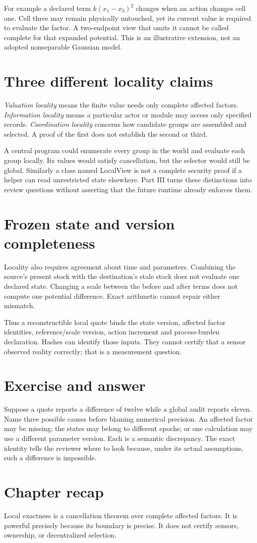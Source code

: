 For example a declared term $k(x_1-x_3)^2$ changes when an action changes
cell one. Cell three may remain physically untouched, yet its current
value is required to evaluate the factor. A two-endpoint view that omits
it cannot be called complete for that expanded potential. This is an
illustrative extension, not an adopted nonseparable Gaussian model.

\section{Three different locality claims}
\emph{Valuation locality} means the finite value needs only complete
affected factors. \emph{Information locality} means a particular actor or
module may access only specified records. \emph{Coordination locality}
concerns how candidate groups are assembled and selected. A proof of the
first does not establish the second or third.

A central program could enumerate every group in the world and evaluate
each group locally. Its values would satisfy cancellation, but the selector
would still be global. Similarly a class named LocalView is not a complete
security proof if a helper can read unrestricted state elsewhere. Part III
turns these distinctions into review questions without asserting that the
future runtime already enforces them.

\section{Frozen state and version completeness}
Locality also requires agreement about time and parameters. Combining the
source's present stock with the destination's stale stock does not evaluate
one declared state. Changing a scale between the before and after terms
does not compute one potential difference. Exact arithmetic cannot repair
either mismatch.

Thus a reconstructible local quote binds the state version, affected factor
identities, reference/scale version, action increment and process-burden
declaration. Hashes can identify those inputs. They cannot certify that a
sensor observed reality correctly; that is a measurement question.

\section*{Exercise and answer}
Suppose a quote reports a difference of twelve while a global audit reports
eleven. Name three possible causes before blaming numerical precision.
An affected factor may be missing; the states may belong to different
epochs; or one calculation may use a different parameter version. Each is
a semantic discrepancy. The exact identity tells the reviewer where to
look because, under its actual assumptions, such a difference is impossible.

\section*{Chapter recap}
Local exactness is a cancellation theorem over complete affected factors.
It is powerful precisely because its boundary is precise. It does not
certify sensors, ownership, or decentralized selection.
